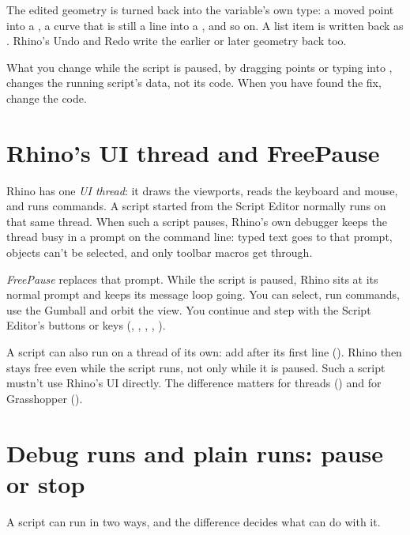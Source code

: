 The edited geometry is turned back into the variable's own type: a moved point into a , a
curve that is still a line into a , and so on. A list item is written back as
. Rhino's Undo and Redo write the earlier or later geometry back too.

\begin{caution}
What you change while the script is paused, by dragging points or typing into , changes
the running script's data, not its code. When you have found the fix, change the code.
\end{caution}

\section{Rhino's UI thread and FreePause}\label{sec:uithread}

Rhino has one \emph{UI thread}: it draws the viewports, reads the keyboard and mouse, and runs
commands. A script started from the Script Editor normally runs on that same thread. When such a
script pauses, Rhino's own debugger keeps the thread busy in a  prompt on the command
line: typed text goes to that prompt, objects can't be selected, and only toolbar macros get through.

\emph{FreePause} replaces that prompt. While the script is paused, Rhino sits at its normal
 prompt and keeps its message loop going. You can select, run commands, use the Gumball
and orbit the view. You continue and step with the Script Editor's buttons or keys
(, , , , ).

A script can also run on a thread of its own: add  after its first line
(). Rhino then stays free even while the script runs, not only while it is paused.
Such a script mustn't use Rhino's UI directly. The difference matters for threads ()
and for Grasshopper ().

\section{Debug runs and plain runs: pause or stop}\label{sec:runkinds}

A script can run in two ways, and the difference decides what  can do with it.

